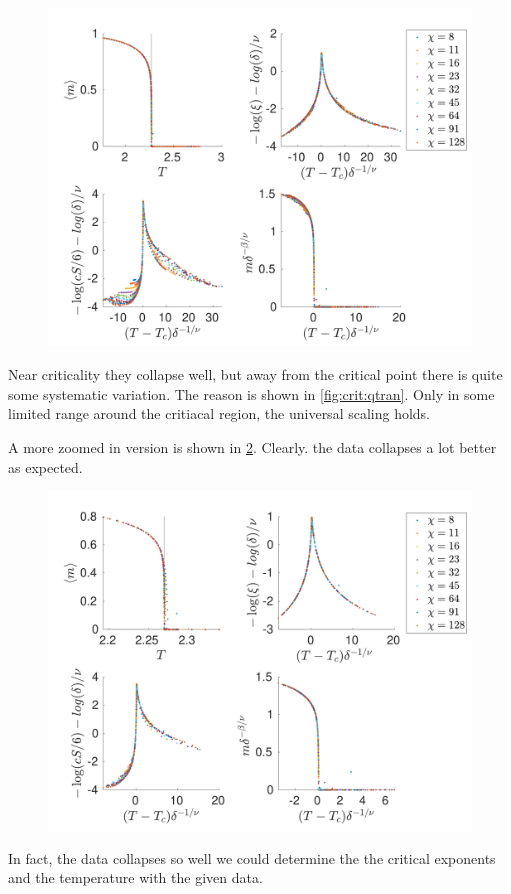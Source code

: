 \begin{figure}
    \center
    \includegraphics[width=\textwidth]{Figuren/phasediag/g0/Full.pdf}
    \caption{  }
    \label{fig:phase:g0:full}
\end{figure}


Near criticality they collapse well, but away from the critical point there is quite some systematic variation. The reason is shown in \cref{fig:crit:qtran}. Only in some limited range around the critiacal region, the universal scaling holds.

A more zoomed in version is shown in \cref{fig:phase:g0:zoomed}. Clearly. the data collapses a lot better as expected.
\begin{figure}
    \center
    \includegraphics[width=\textwidth]{Figuren/phasediag/g0/zoomed.pdf}
    \caption{  }
    \label{fig:phase:g0:zoomed}
\end{figure}
In fact, the data collapses so well we could determine the the critical exponents and the temperature with the given data.

